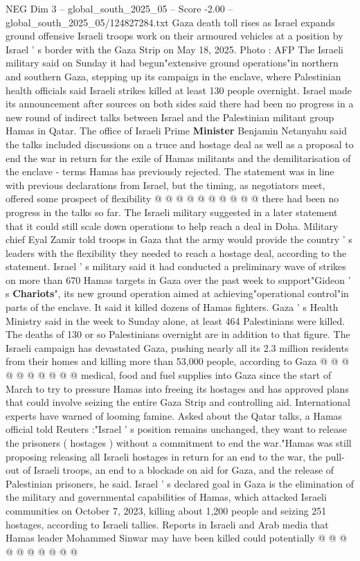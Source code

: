 \begin{textsample}{NEG Dim 3 – global\_south\_2025\_05 – Score -2.00 – global\_south\_2025\_05/124827284.txt}  \label{ex:f3_neg_176}
Gaza death toll rises as Israel expands ground offensive Israeli troops work on their armoured vehicles at a position by Israel ' s border with the Gaza Strip on May 18, 2025.
Photo : AFP The Israeli military said on Sunday it had begun"extensive ground operations"in northern and southern Gaza, stepping up its campaign in the enclave, where Palestinian health officials said Israeli strikes killed at least 130 people overnight.
Israel made its announcement after sources on both sides said there had been no progress in a new round of indirect talks between Israel and the Palestinian militant group Hamas in Qatar.
The office of Israeli Prime \textbf{Minister} Benjamin Netanyahu said the talks included discussions on a truce and hostage deal as well as a proposal to end the war in return for the exile of Hamas militants and the demilitarisation of the enclave - terms Hamas has previously rejected.
The statement was in line with previous declarations from Israel, but the timing, as negotiators meet, offered some prospect of flexibility @ @ @ @ @ @ @ @ @ @ there had been no progress in the talks so far.
The Israeli military suggested in a later statement that it could still scale down operations to help reach a deal in Doha.
Military chief Eyal Zamir told troops in Gaza that the army would provide the country ' s leaders with the flexibility they needed to reach a hostage deal, according to the statement.
Israel ' s military said it had conducted a preliminary wave of strikes on more than 670 Hamas targets in Gaza over the past week to support"Gideon ' s \textbf{Chariots}", its new ground operation aimed at achieving"operational control"in parts of the enclave.
It said it killed dozens of Hamas fighters.
Gaza ' s Health Ministry said in the week to Sunday alone, at least 464 Palestinians were killed.
The deaths of 130 or so Palestinians overnight are in addition to that figure.
The Israeli campaign has devastated Gaza, pushing nearly all its 2.3 million residents from their homes and killing more than 53,000 people, according to Gaza @ @ @ @ @ @ @ @ @ @ medical, food and fuel supplies into Gaza since the start of March to try to pressure Hamas into freeing its hostages and has approved plans that could involve seizing the entire Gaza Strip and controlling aid.
International experts have warned of looming famine.
Asked about the Qatar talks, a Hamas official told Reuters :"Israel ' s position remains unchanged, they want to release the prisoners ( hostages ) without a commitment to end the war."Hamas was still proposing releasing all Israeli hostages in return for an end to the war, the pull-out of Israeli troops, an end to a blockade on aid for Gaza, and the release of Palestinian prisoners, he said.
Israel ' s declared goal in Gaza is the elimination of the military and governmental capabilities of Hamas, which attacked Israeli communities on October 7, 2023, killing about 1,200 people and seizing 251 hostages, according to Israeli tallies.
Reports in Israeli and Arab media that Hamas leader Mohammed Sinwar may have been killed could potentially @ @ @ @ @ @ @ @ @ @

\end{textsample}
